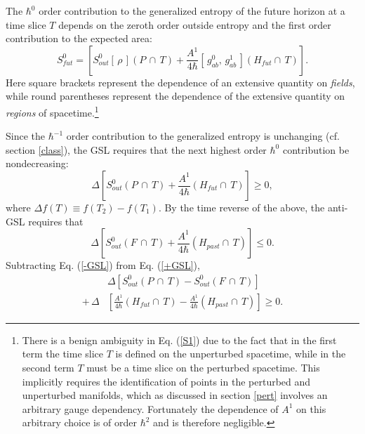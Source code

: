 \documentclass{article}
\begin{document}
The $\hbar^0$ order contribution to the generalized entropy of the future horizon at a time slice $T$ depends on the zeroth order outside entropy and the first order contribution to the expected area:
\begin{equation}\label{S1}
S_{fut}^{0} = \left[ S_{out}^{0}[\,\rho\,](P\,\cap\,T) 
+ \frac{A^{1}}{4\hbar}[\,g_{ab}^{0},\,g_{ab}^{1}\,](H_{fut}\cap\,T) \right].
\end{equation}
Here square brackets represent the dependence of an extensive quantity on \emph{fields}, while round parentheses represent the dependence of the extensive quantity on \emph{regions} of spacetime.\footnote{There is a benign ambiguity in Eq. (\ref{S1}) due to the fact that in the first term the time slice $T$ is defined on the unperturbed spacetime, while in the second term $T$ must be a time slice on the perturbed spacetime.  This implicitly requires the identification of points in the perturbed and unperturbed manifolds, which as discussed in section \ref{pert} involves an arbitrary gauge dependency.  Fortunately the dependence of $A^{1}$ on this arbitrary choice is of order $\hbar^2$ and is therefore negligible.}

Since the $\hbar^{-1}$ order contribution to the generalized entropy is unchanging (cf. section \ref{class}), the GSL requires that the next highest order $\hbar^{0}$ contribution be nondecreasing:
\begin{equation}\label{+GSL}
\Delta \left[ S_{out}^{0}(P\,\cap\,T) + \frac{A^{1}}{4\hbar}(H_{fut}\cap\,T) \right] \ge 0,
\end{equation} 
where $\Delta f(T) \equiv f(T_2) - f(T_1)$.  By the time reverse of the above, the anti-GSL requires that
\begin{equation}\label{-GSL}
\Delta \left[ S_{out}^{0}(F\,\cap\,T) + 
\frac{A^{1}}{4\hbar}(H_{past}\cap\,T) \right] \le 0.
\end{equation}
Subtracting Eq. (\ref{-GSL}) from Eq. (\ref{+GSL}),
\begin{align}\label{dif1}
& \Delta \left[ S_{out}^{0}(P\,\cap\,T) 
- S_{out}^{0}(F\,\cap\,T) \right] \\ \label{dif2}
+\,\Delta &\left[ \frac{A^{1}}{4\hbar}(H_{fut}\cap\,T)
- \frac{A^{1}}{4\hbar}(H_{past}\cap\,T) \right] \ge 0.
\end{align}
\end{document}
